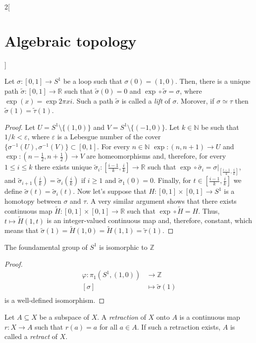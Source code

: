 \documentclass[../../../main_math.tex]{subfiles}
\begin{document}
\begin{multicols}{2}[\section{Algebraic topology}]
	\begin{lemma}
		Let $\sigma: [0,1] \to S^1$ be a loop such that $\sigma(0)=(1,0)$. Then, there is a unique path $\tilde{\sigma}: [0,1] \to \mathbb{R}$ such that $\tilde{\sigma}(0)=0$ and $\operatorname{exp}\circ\tilde{\sigma}=\sigma$, where $\operatorname{exp}(x)=\exp{2\pi x i}$. Such a path $\tilde{\sigma}$ is called a \emph{lift} of $\sigma$. Morover, if $\sigma \simeq \tau$ then $\tilde{\sigma}(1)=\tilde{\tau}(1)$.
	\end{lemma}
	\begin{proof}
		Let $U=S^1\setminus\{(1,0)\}$ and $V=S^1\setminus\{(-1,0)\}$. Let $k\in \mathbb{N}$ be such that $1/k<\varepsilon$, where $\varepsilon$ is a Lebesgue number of the cover $\{\sigma^{-1}(U), \sigma^{-1}(V)\}\subset [0,1]$. For every $n\in \mathbb{N}$ $\operatorname{exp}: (n,n+1)\to U$ and $\operatorname{exp}: (n-\frac{1}{2},n+\frac{1}{2})\to V$ are homeomorphisms and, therefore, for every $1\leq i \leq k$ there exists unique $\tilde{\sigma}_i: [\frac{i-1}{k}, \frac{i}{k}]\to \mathbb{R}$ such that $\operatorname{exp}\circ\tilde{\sigma_i}=\sigma|_{[\frac{i-1}{k}, \frac{i}{k}]}$, and $\tilde{\sigma}_{i+1}(\frac{i}{k})=\tilde{\sigma}_i(\frac{i}{k})$ if $i\geq 1$ and $\tilde{\sigma}_{1}(0)=0$. Finally, for $t\in[\frac{i-1}{k}, \frac{i}{k}]$ we define $\tilde{\sigma}(t)=\tilde{\sigma}_i(t)$. Now let's suppose that $H:[0,1]\times[0,1]\to S^1$ is a homotopy between $\sigma$ and $\tau$. A very similar argument shows that there exists continuous map $\tilde{H}:[0,1]\times[0,1]\to \mathbb{R}$ such that $\operatorname{exp}\circ \tilde{H}=H$. Thus, $t\mapsto \tilde{H}(1,t)$ is an integer-valued continuous map and, therefore, constant, which means that $\tilde{\sigma}(1)=\tilde{H}(1,0)=\tilde{H}(1,1)=\tilde{\tau}(1)$.
	\end{proof}
	
	\begin{theorem}
		The foundamental group of $S^1$ is isomorphic to $\mathbb{Z}$
	\end{theorem}
	
	\begin{proof}
		\begin{align*}
			\varphi: \pi_1(S^1, (1,0)) &\longrightarrow \mathbb{Z} \\
			[\sigma]&\longmapsto \tilde{\sigma}(1) \\
		\end{align*}
		is a well-defined isomorphism.
	\end{proof}
	
	\begin{definition}
		Let $A\subseteq X$ be a subspace of $X$. A \emph{retraction} of $X$ onto $A$ is a continuous map $r: X \to A$ such that $r(a)=a$ for all $a\in A$. If such a retraction exists, $A$ is called a \emph{retract} of $X$. 
	\end{definition}


\end{multicols}
\end{document}
